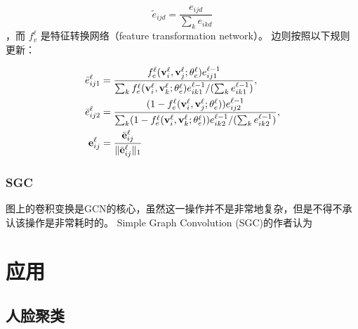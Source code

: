 \documentclass[color=gray,base=hide,cn]{elegantbook}
\begin{document}
\begin{equation}
    {\tilde e}_{ijd} = \frac{e_{ijd}}{\sum_{k}e_{ikd}}
\end{equation}
，而 $f_v^{\ell}$ 是特征转换网络（feature transformation network）。
边则按照以下规则更新：

\begin{align}
{\bar e}_{ij1}^{\ell} & = \frac{f_{e}^{\ell}({\bf v}_{i}^{\ell}, {\bf v}_{j}^{\ell}; \theta_e^{\ell})e_{ij1}^{\ell-1}}{\sum_{k}f_{e}^{\ell}({\bf v}_{i}^{\ell}, {\bf v}_{k}^{\ell}; \theta_e^{\ell})e_{ik1}^{\ell-1}/(\sum_{k}e_{ik1}^{\ell-1})}, \\ 
{\bar e}_{ij2}^{\ell} & =\frac{(1-f_{e}^{\ell}({\bf v}_{i}^{\ell}, {\bf v}_{j}^{\ell}; \theta_e^{\ell}))e_{ij2}^{\ell-1}}{\sum_{k}(1-f_{e}^{\ell}({\bf v}_{i}^{\ell}, {\bf v}_{k}^{\ell}; \theta_e^{\ell}))e_{ik2}^{\ell-1}/(\sum_{k}e_{ik2}^{\ell-1})},
\\
{\bf e}_{ij}^{\ell} & = \frac{{\bar {\bf e}}_{ij}^{\ell}} {\|{\bar {\bf e}}_{ij}^{\ell}\|_1}
\end{align}


\section{SGC}
图上的卷积变换是GCN的核心，虽然这一操作并不是非常地复杂，但是不得不承认该操作是非常耗时的。 Simple Graph Convolution (SGC)\cite{wu2019simplifying}的作者认为

\part{应用}
\chapter{人脸聚类}



\end{document}
